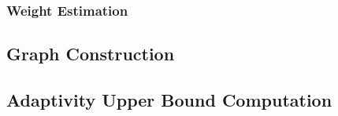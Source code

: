 \subsubsection{Weight Estimation}
\label{sec:alg_weightgen}

%
%
\subsection{Graph Construction}
\label{sec:alg_graphgen}


\subsection{Adaptivity Upper Bound Computation}
\label{sec:alg_adaptcompute}
